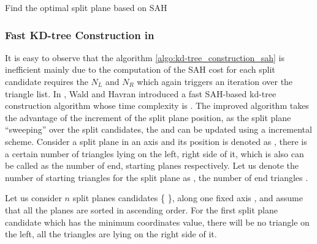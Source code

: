 \begin{algorithm}[H]
        \myfunc \FindSplitPlaneSAH{\triangleList, \voxel, \axis} \Return \splitPlaneBest \newline
        \caption{Find the optimal split plane based on SAH}
        \label{algo:kd-tree_construction_sah}
\end{algorithm}

\subsubsection{Fast KD-tree Construction in \mycomplexitynlogn} 
It is easy to observe that the algorithm \ref{algo:kd-tree_construction_sah} is inefficient mainly due to the computation of the SAH cost for each split candidate requires the \(N_{L}\) and \(N_{R}\) which again triggers an iteration over the triangle list. In \cite{wh2006}, Wald and Havran introduced a fast SAH-based kd-tree construction algorithm whose time complexity is \mycomplexitynlogn. The improved algorithm takes the advantage of the increment of the split plane position, as the split plane ``sweeping'' over the split candidates,  the \mynumtrileft and \mynumtriright can be updated using a incremental scheme. Consider a split plane \mysplitplane in an axis \mydimension and its position is denoted as \mysplitplanepos, there is a certain number of triangles lying on the left, right side of it, which is also can be called as the number of end, starting planes respectively. Let us denote the number of starting triangles for the split plane \mysplitplane as \mynumtristartp, the number of end triangles \mynumtriendp.   

Let us consider \(n\) split planes candidates \{  \}, along one fixed axis \mydimension, and assume that all the planes are sorted in ascending order. For the first split plane candidate  which has the minimum coordinates value, there will be no triangle on the left, all the triangles are lying on the right side of it. 

